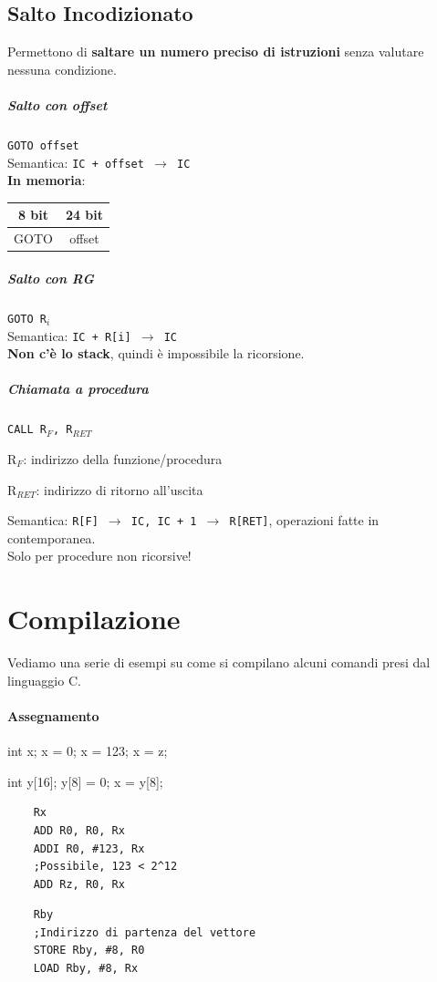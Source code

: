 \documentclass[10pt]{report}
\begin{document}
\subsection{Salto Incodizionato}
Permettono di \textbf{saltare un numero preciso di istruzioni} senza valutare nessuna condizione.
\subparagraph{Salto con offset} \texttt{GOTO offset}\\
Semantica: \texttt{IC + offset $\rightarrow$ IC}\\
\textbf{In memoria}:  
\begin{tabular}{| c | c |}
\hline
8 bit & 24 bit \\
\hline
GOTO & offset \\
\hline
\end{tabular}
\subparagraph{Salto con RG} \texttt{GOTO R$_i$}\\
Semantica: \texttt{IC + R[i] $\rightarrow$ IC}\\
\textbf{Non c'è lo stack}, quindi è impossibile la ricorsione.
\subparagraph{Chiamata a procedura} \texttt{CALL R$_F$, R$_{RET}$}
\begin{list}{}{}
	\item R$_F$: indirizzo della funzione/procedura
	\item R$_{RET}$: indirizzo di ritorno all'uscita
\end{list}
Semantica: \texttt{R[F] $\rightarrow$ IC, IC + 1 $\rightarrow$ R[RET]}, operazioni fatte in contemporanea.\\
Solo per procedure non ricorsive!
\pagebreak
\section{Compilazione}
Vediamo una serie di esempi su come si compilano alcuni comandi presi dal linguaggio C.
\paragraph{Assegnamento}
\begin{multicols}{2}
\begin{center}
	\begin{C}
	int x;
	x = 0;
	x = 123;
	x = z;
	\end{C}
	\begin{C}
	int y[16];
	y[8] = 0;
	x = y[8];
	\end{C}
\end{center}
\columnbreak
\begin{center}
	\begin{lstlisting}
	Rx
	ADD R0, R0, Rx
	ADDI R0, #123, Rx
	;Possibile, 123 < 2^12
	ADD Rz, R0, Rx
	\end{lstlisting}
	\begin{lstlisting}
	Rby
	;Indirizzo di partenza del vettore
	STORE Rby, #8, R0
	LOAD Rby, #8, Rx
	\end{lstlisting}
\end{center}
\end{multicols}
\end{document}
